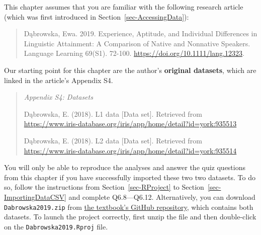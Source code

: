 \documentclass[
  letterpaper,
  DIV=11,
  numbers=noendperiod]{scrreprt}
\begin{document}
\begin{tcolorbox}[enhanced jigsaw, arc=.35mm, bottomrule=.15mm, bottomtitle=1mm, breakable, colback=white, colbacktitle=quarto-callout-warning-color!10!white, colframe=quarto-callout-warning-color-frame, coltitle=black, left=2mm, leftrule=.75mm, opacityback=0, opacitybacktitle=0.6, rightrule=.15mm, title=\textcolor{quarto-callout-warning-color}{\faExclamationTriangle}\hspace{0.5em}{Prerequisites}, titlerule=0mm, toprule=.15mm, toptitle=1mm]

This chapter assumes that you are familiar with the following research
article (which was first introduced in Section~\ref{sec-AccessingData}):

\begin{quote}
Dąbrowska, Ewa. 2019. Experience, Aptitude, and Individual Differences
in Linguistic Attainment: A Comparison of Native and Nonnative Speakers.
Language Learning 69(S1). 72-100.
\url{https://doi.org/10.1111/lang.12323}.
\end{quote}

Our starting point for this chapter are the author's \textbf{original
datasets}, which are linked in the article's Appendix S4.

\begin{quote}
\emph{Appendix S4: Datasets}

Dąbrowska, E. (2018). L1 data {[}Data set{]}. Retrieved from
\href{https://www.iris-database.org/details/9pplf-S7kw3}{https://www.iris-database.org/iris/app/home/detail?id=york:935513}

Dąbrowska, E. (2018). L2 data {[}Data set{]}. Retrieved from
\href{https://www.iris-database.org/details/L8w1U-ZDgnH}{https://www.iris-database.org/iris/app/home/detail?id=york:935514}
\end{quote}

You will only be able to reproduce the analyses and answer the quiz
questions from this chapter if you have successfully imported these two
two datasets. To do so, follow the instructions from
Section~\ref{sec-RProject} to Section~\ref{sec-ImportingDataCSV} and
complete {Q6.8}---{Q6.12}. Alternatively, you can download
\texttt{Dabrowska2019.zip} from
\href{https://github.com/elenlefoll/RstatsTextbook/raw/69d1e31be7394f2b612825f031ebffeb75886390/Dabrowska2019.zip}{the
textbook's GitHub repository}, which contains both datasets. To launch
the project correctly, first unzip the file and then double-click on the
\texttt{Dabrowska2019.Rproj} file.

\end{tcolorbox}
\end{document}
